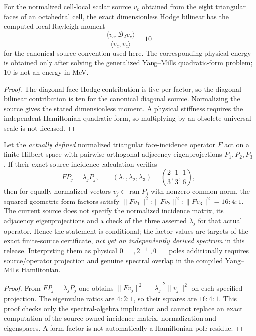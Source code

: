 \documentclass[12pt,a4paper]{article}
\begin{document}
\begin{corollary}
\label{p11:cor:cell-local-scalar-curvature-stiffness}

For the normalized cell-local scalar source \(v_c\) obtained from the eight triangular faces of an octahedral cell, the exact dimensionless Hodge bilinear has the computed local Rayleigh moment
\[
\frac{\langle v_c,\mathcal B_2v_c\rangle}{\langle v_c,v_c\rangle}=10
\]
for the canonical source convention used here.  The corresponding physical energy is obtained only after solving the generalized Yang--Mills quadratic-form problem; \(10\) is not an energy in MeV.
\label{p11:eq:cell-local-scalar-source}
\label{p11:eq:cell-local-scalar-projected-hessian}
\label{p11:eq:cell-local-scalar-stiffness-energy}
\end{corollary}
\begin{proof}

The diagonal face-Hodge contribution is five per factor, so the diagonal bilinear contribution is ten for the canonical diagonal source.  Normalizing the source gives the stated dimensionless moment.  A physical stiffness requires the independent Hamiltonian quadratic form, so multiplying by an obsolete universal scale is not licensed.
\end{proof}


\begin{corollary}
\label{p11:cor:finite-face-incidence-glue-residues}
Let the \emph{actually defined} normalized triangular face-incidence
operator $F$ act on a finite Hilbert space with pairwise orthogonal
adjacency eigenprojections $P_1,P_2,P_3$. If their exact source
incidence calculation verifies
\[
 F P_j=\lambda_jP_j,\qquad
 (\lambda_1,\lambda_2,\lambda_3)
 =\left(\frac23,\frac13,\frac16\right),
\]
then for equally normalized vectors $v_j\in\operatorname{ran}P_j$
with nonzero common norm, the squared geometric form factors satisfy
$\|Fv_1\|^2:\|Fv_2\|^2:\|Fv_3\|^2=16:4:1$.
The current source does not specify the normalized incidence matrix,
its adjacency eigenprojections and a check of the three asserted
\(\lambda_j\) for that actual operator. Hence the statement is
conditional; the factor values are targets of the exact finite-source
certificate, \emph{not yet an independently derived spectrum} in this release.
Interpreting them as physical $0^{++},2^{++},0^{-+}$ poles additionally
requires source/operator projection and genuine spectral overlap in the
compiled Yang--Mills Hamiltonian.
\label{p11:eq:triangle-incidence-source-operator}
\label{p11:eq:glue-face-form-factors}
\label{p11:eq:glue-reduced-residue-ratio}
\end{corollary}
\begin{proof}
From $FP_j=\lambda_jP_j$ one obtains
$\|Fv_j\|^2=|\lambda_j|^2\|v_j\|^2$ on each specified
projection. The eigenvalue ratios are $4:2:1$, so their squares are
$16:4:1$. This proof checks only the spectral-algebra implication and
cannot replace an exact computation of the source-owned incidence matrix,
normalization and eigenspaces. A form factor is not automatically a
Hamiltonian pole residue.
\end{proof}
\end{document}
